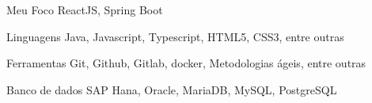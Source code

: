
\begin{cvskills}
  \cvskill
    {Meu Foco}
    {ReactJS, Spring Boot}
  
  \cvskill
    {Linguagens}
    {Java, Javascript, Typescript, HTML5, CSS3, entre outras}

  \cvskill
    {Ferramentas}
    {Git, Github, Gitlab, docker, Metodologias ágeis, entre outras}

  \cvskill
    {Banco de dados}
    {SAP Hana, Oracle, MariaDB, MySQL, PostgreSQL}
    
\end{cvskills}
